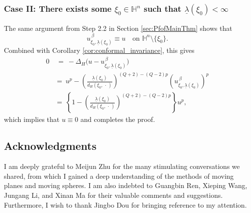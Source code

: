 \documentclass[reqno]{amsart}
\theoremstyle{definition}
\theoremstyle{remark}
\numberwithin{equation}{section}
\begin{document}
\subsubsection*{Case II: There exists some $\xi_0 \in \mathbb{H}^n$ such that $\underline{\lambda}(\xi_0) < \infty$}
The same argument from Step 2.2 in Section \ref{sec:PfofMainThm} shows that
\[
u_{\xi_0, \underline{\lambda}(\xi_0)}^{\, \beta} \equiv u \quad \text{on } \mathbb{H}^{n}\setminus \{\xi_0\}.
\]
Combined with Corollary \ref{cor:conformal_invariance}, this gives
\[
\begin{aligned}
0 & ~=~ -\Delta_{\! H} \bigl( u - u_{\xi_0, \underline{\lambda}(\xi_0)}^{\, \beta}  \bigr) \\
&=~ u^p - \left( \frac{ \underline{\lambda}(\xi_0) }{ d_{\! H} (\xi_0, \,\cdot\,) } \right)^{(Q+2) - (Q-2)p} \left(u_{\xi_0, \underline{\lambda}(\xi_0)}^{\, \beta}\right)^p \\
&=~ \left\{ 1 - \left( \frac{ \underline{\lambda}(\xi_0) }{ d_{\! H} (\xi_0, \,\cdot\,) } \right)^{(Q+2) - (Q-2)p} \right\} u^p,
\end{aligned}
\]
which implies that $u \equiv 0$ and completes the proof. 

\subsection*{Acknowledgments}
I am deeply grateful to Meijun Zhu for the many stimulating conversations we shared, from which I gained a deep understanding of the methods of moving planes and moving spheres.  I am also indebted to Guangbin Ren, Xieping Wang, Jungang Li, and Xinan Ma for their valuable comments and suggestions. Furthermore, I wish to thank Jingbo Dou for bringing reference \cite{HWZ17} to my attention.
\end{document}
